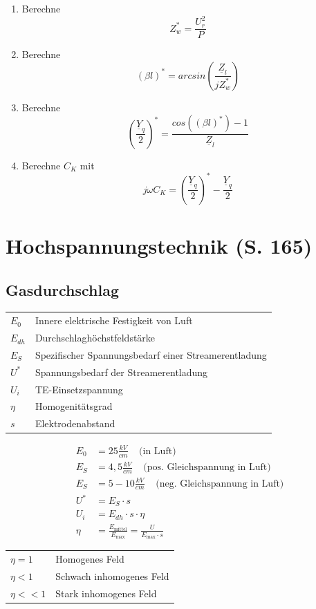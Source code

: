 \documentclass[a4paper,twocolumn,10pt]{article}
\begin{document}
\begin{enumerate}
\item Berechne
\begin{equation*}
Z_w^*=\frac{U_r^2}{P}
\end{equation*}
\item Berechne
\begin{equation*}
(\beta l)^*=arcsin\left(\frac{\underline{Z}_l}{jZ_w^*}\right)
\end{equation*}
\item Berechne
\begin{equation*}
\left(\frac{\underline{Y}_q}{2}\right)^*=\frac{cos\left((\beta l)^*\right)-1}{\underline{Z}_l}
\end{equation*}
\item Berechne $C_K$ mit
\begin{equation*}
j\omega C_K=\left(\frac{\underline{Y}_q}{2}\right)^*-\frac{\underline{Y}_q}{2}
\end{equation*}
\end{enumerate}
\newpage
\section{Hochspannungstechnik (S. 165)}

\subsection{Gasdurchschlag}
\begin{tabular}{ll}
$E_0$ & Innere elektrische Festigkeit von Luft\\
$E_{dh}$ & Durchschlaghöchstfeldstärke\\
$E_S$ & Spezifischer Spannungsbedarf einer Streamerentladung\\
$U^*$ & Spannungsbedarf der Streamerentladung\\
$U_i$ & TE-Einsetzspannung\\
$\eta$ & Homogenitätsgrad\\
$s$ & Elektrodenabstand
\end{tabular}
\begin{equation*}
\begin{split}
E_0&= 25\frac{kV}{cm}\;\;\;\;\text{(in Luft)}\\
E_S&=4,5\frac{kV}{cm}\;\;\;\;\text{(pos. Gleichspannung in Luft)}\\
E_S&=5-10\frac{kV}{cm}\;\;\;\;\text{(neg. Gleichspannung in Luft)}\\
U^*&=E_S\cdot s\\
U_i&=E_{dh}\cdot s\cdot \eta\\
\eta &=\frac{E_{\text{mittel}}}{E_{\text{max}}}=\frac{U}{E_{\text{max}}\cdot s}
\end{split}
\end{equation*}
\begin{tabular}{ll}
$\eta =1$ & Homogenes Feld\\
$\eta <1$ & Schwach inhomogenes Feld\\
$\eta <<1$ & Stark inhomogenes Feld
\end{tabular}
\end{document}
